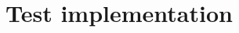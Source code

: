 \documentclass[11pt]{article}
\begin{document}




\section{Test implementation}















\end{document}
